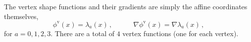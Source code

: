 %

The vertex shape functions and their gradients are simply the affine coordinates themselves,
\begin{equation}
	\phi^\mathrm{v}(x)= \lambda_a(x)\,,\qquad\quad
	\nabla\phi^\mathrm{v}(x)=\nabla\lambda_a(x)\,,
\end{equation}
for $a=0,1,2,3$.
There are a total of $4$ vertex functions (one for each vertex).

